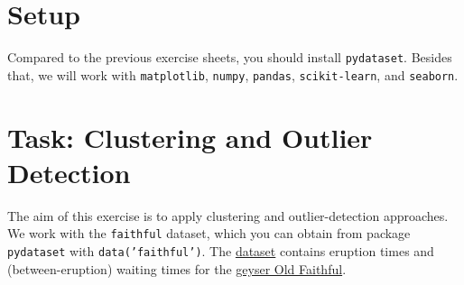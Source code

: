 \documentclass[12pt]{article}
\newcommand{\code}[1]{\textcolor{kitgreen}{\texttt{#1}}}
\begin{document}
\section*{Setup}

Compared to the previous exercise sheets, you should install \code{pydataset}.
Besides that, we will work with \code{matplotlib}, \code{numpy}, \code{pandas}, \code{scikit-learn}, and \code{seaborn}.

\section*{Task: Clustering and Outlier Detection}

The aim of this exercise is to apply clustering and outlier-detection approaches.
We work with the \code{faithful} dataset, which you can obtain from package \code{pydataset} with \code{data('faithful')}.
The \href{https://www.rdocumentation.org/packages/datasets/versions/3.6.2/topics/faithful}{dataset} contains eruption times and (between-eruption) waiting times for the \href{https://en.wikipedia.org/wiki/Old_Faithful}{geyser Old Faithful}.
\end{document}
